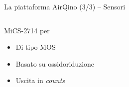 \begin{frame}[t]{La piattaforma AirQino (3/3) – Sensori}
\begin{columns}

\begin{column}{0.5\textwidth}
\begin{center}

\begin{block}{MiCS-2714 per }
\begin{figure}[H]
    \centering
\end{figure}
\vspace{0.1cm}
\begin{itemize}
  \item Di tipo MOS
  \item Basato su ossidoriduzione
  \item Uscita in \textit{counts}
\end{itemize}
\vspace{0.1cm}

\end{block}

\end{center}
\end{column}


\end{columns}
\end{frame}
